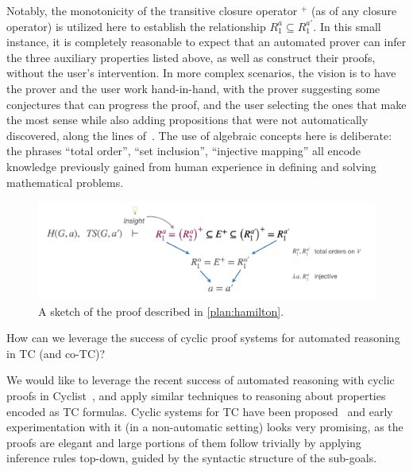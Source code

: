 \begin{example}
Notably, the monotonicity of the transitive closure operator $^+$ (as of any closure operator) is utilized here to establish the relationship $R_1^a \subseteq R_1^{a'}$.
In this small instance, it is completely reasonable to expect that an automated prover can infer the three auxiliary properties listed above, as well as construct their proofs, without the user's intervention.
In more complex scenarios, the vision is to have the prover and the user work hand-in-hand, with the prover suggesting some conjectures that can progress the proof, and the user selecting the ones that make the most sense while also adding propositions that were not automatically discovered, along the lines of~\cite{PLDI2016:Padon}.
The use of algebraic concepts here is deliberate: the phrases ``total order'', ``set inclusion'', ``injective mapping'' all encode knowledge previously gained from human experience in defining and solving mathematical problems.
\end{example}


\begin{figure}
\begin{center}
\includegraphics[width=.8\textwidth]{img/topological-and-hamilton-proof-sketch.png}
\end{center}
\vspace{-2em}
\caption{A sketch of the proof described in \autoref{plan:hamilton}.}
\label{plan:hamilton-proof}
\end{figure}


\begin{researchquestion}How can we leverage the success of cyclic proof systems for automated reasoning in TC (and co-TC)?
\end{researchquestion}

We would like to leverage the recent success of automated reasoning with cyclic proofs in Cyclist~\cite{CPP2017:Rowe}, and apply similar techniques to reasoning about properties encoded as TC formulas.
Cyclic systems for TC have been proposed~\cite{TOCL2020:Cohen,IJCAR2020:Cohen} and early experimentation with it (in a non-automatic setting) looks very promising, as the proofs are elegant and large portions of them follow trivially by applying inference rules top-down, guided by the syntactic structure of the sub-goals.


